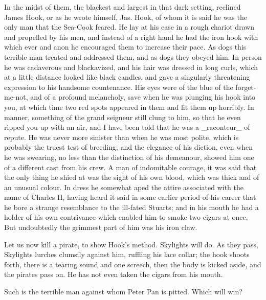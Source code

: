 In the midst of them, the blackest and largest in that dark setting,
reclined James Hook, or as he wrote himself, Jas. Hook, of whom it is
said he was the only man that the Sea-Cook feared. He lay at his ease
in a rough chariot drawn and propelled by his men, and instead of a
right hand he had the iron hook with which ever and anon he encouraged
them to increase their pace. As dogs this terrible man treated and
addressed them, and as dogs they obeyed him. In person he was
cadaverous and blackavized, and his hair was dressed in long curls,
which at a little distance looked like black candles, and gave a
singularly threatening expression to his handsome countenance. His eyes
were of the blue of the forget-me-not, and of a profound melancholy,
save when he was plunging his hook into you, at which time two red
spots appeared in them and lit them up horribly. In manner, something
of the grand seigneur still clung to him, so that he even ripped you up
with an air, and I have been told that he was a _raconteur_ of repute.
He was never more sinister than when he was most polite, which is
probably the truest test of breeding; and the elegance of his diction,
even when he was swearing, no less than the distinction of his
demeanour, showed him one of a different cast from his crew. A man of
indomitable courage, it was said that the only thing he shied at was
the sight of his own blood, which was thick and of an unusual colour.
In dress he somewhat aped the attire associated with the name of
Charles II, having heard it said in some earlier period of his career
that he bore a strange resemblance to the ill-fated Stuarts; and in his
mouth he had a holder of his own contrivance which enabled him to smoke
two cigars at once. But undoubtedly the grimmest part of him was his
iron claw.

Let us now kill a pirate, to show Hook's method. Skylights will do. As
they pass, Skylights lurches clumsily against him, ruffling his lace
collar; the hook shoots forth, there is a tearing sound and one
screech, then the body is kicked aside, and the pirates pass on. He has
not even taken the cigars from his mouth.

Such is the terrible man against whom Peter Pan is pitted. Which will
win?

